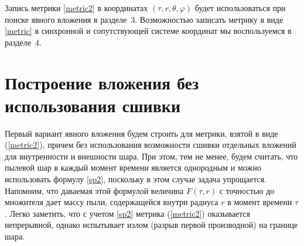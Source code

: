 \documentclass[12pt]{article}
\begin{document}
Запись метрики \eqref{metric2} в координатах $(\tau, r, \theta, \varphi)$ будет использоваться при поиске явного вложения в разделе~3.
Возможностью записать метрику в виде \eqref{metric} в синхронной и сопутствующей системе координат мы воспользуемся в разделе~4.



\section{Построение вложения без использования сшивки}
Первый вариант явного вложения будем строить для метрики, взятой в виде (\ref{metric2}),
причем без использования возможности сшивки отдельных вложений для внутренности и внешности шара.
При этом, тем не менее, будем считать, что пылевой шар в каждый момент времени является однородным и можно использовать формулу
\eqref{sp2}, поскольку в этом случае задача упрощается.
Напомним, что даваемая этой формулой величина $F(\tau, r)$ с точностью до множителя дает массу пыли,
содержащейся внутри радиуса $r$ в момент времени $\tau$.
Легко заметить, что с учетом \eqref{sp2} метрика (\ref{metric2}) оказывается непрерывной, однако испытывает излом (разрыв первой производной) на границе шара.
\end{document}

